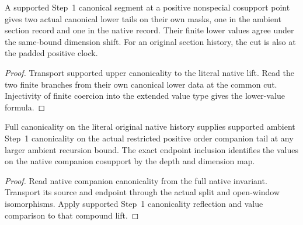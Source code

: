\begin{theorem}
\label{hir:g1-supported-positive-exact-finite-lower-values}
\leanok
A supported Step~1 canonical segment at a positive nonspecial
cosupport point gives two actual canonical lower tails on their
own masks, one in the ambient section record and one in the
native record. Their finite lower values agree under the
same-bound dimension shift. For an original section history,
the cut is also at the padded positive clock.
\end{theorem}
\begin{proof}
Transport supported upper canonicality to the literal native lift.
Read the two finite branches from their own canonical lower data
at the common cut. Injectivity of finite coercion into the
extended value type gives the lower-value formula.
\end{proof}

\begin{theorem}
\label{hir:g1-order-companion-step-one-native-can}
\leanok
Full canonicality on the literal original native history supplies
supported ambient Step~1 canonicality on the actual restricted
positive order companion tail at any larger ambient recursion
bound. The exact endpoint inclusion identifies the values on the
native companion cosupport by the depth and dimension map.
\end{theorem}
\begin{proof}
Read native companion canonicality from the full native invariant.
Transport its source and endpoint through the actual split and
open-window isomorphisms. Apply supported Step~1 canonicality
reflection and value comparison to that compound lift.
\end{proof}

